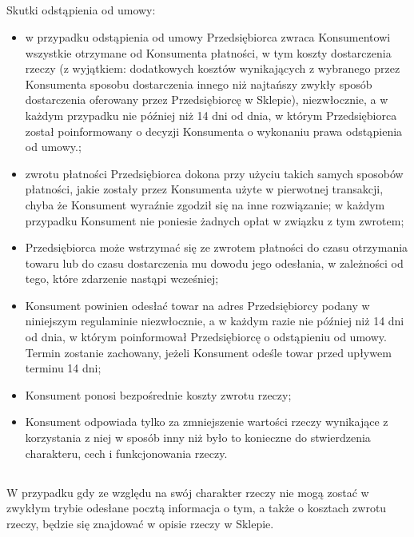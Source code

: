 			\subsection{} Skutki odstąpienia od umowy:
				\begin{itemize}
					\item w przypadku odstąpienia od umowy Przedsiębiorca zwraca Konsumentowi wszystkie otrzymane od Konsumenta płatności, w tym koszty dostarczenia rzeczy (z wyjątkiem: dodatkowych kosztów wynikających z wybranego przez Konsumenta sposobu dostarczenia innego niż najtańszy zwykły sposób dostarczenia oferowany przez Przedsiębiorcę w Sklepie), niezwłocznie, a w każdym przypadku nie później niż 14 dni od dnia, w którym Przedsiębiorca został poinformowany o decyzji Konsumenta o wykonaniu prawa odstąpienia od umowy.;

					\item  zwrotu płatności Przedsiębiorca dokona przy użyciu takich samych sposobów płatności, jakie zostały przez Konsumenta użyte w pierwotnej transakcji, chyba że Konsument wyraźnie zgodził się na inne rozwiązanie; w każdym przypadku Konsument nie poniesie żadnych opłat w związku z tym zwrotem;

					\item  Przedsiębiorca może wstrzymać się ze zwrotem płatności do czasu otrzymania towaru lub do czasu dostarczenia mu dowodu jego odesłania, w zależności od tego, które zdarzenie nastąpi wcześniej;

					\item  Konsument powinien odesłać towar na adres Przedsiębiorcy podany w niniejszym regulaminie niezwłocznie, a w każdym razie nie później niż 14 dni od dnia, w którym poinformował Przedsiębiorcę o odstąpieniu od umowy. Termin zostanie zachowany, jeżeli Konsument odeśle towar przed upływem terminu 14 dni;

					\item  Konsument ponosi bezpośrednie koszty zwrotu rzeczy;

					\item  Konsument odpowiada tylko za zmniejszenie wartości rzeczy wynikające z korzystania z niej w sposób inny niż było to konieczne do stwierdzenia charakteru, cech i funkcjonowania rzeczy.

				\end{itemize}
				
			\subsection{} W przypadku gdy ze względu na swój charakter rzeczy nie mogą zostać w zwykłym trybie odesłane pocztą informacja o tym, a także o kosztach zwrotu rzeczy, będzie się znajdować w opisie rzeczy w Sklepie.
 
